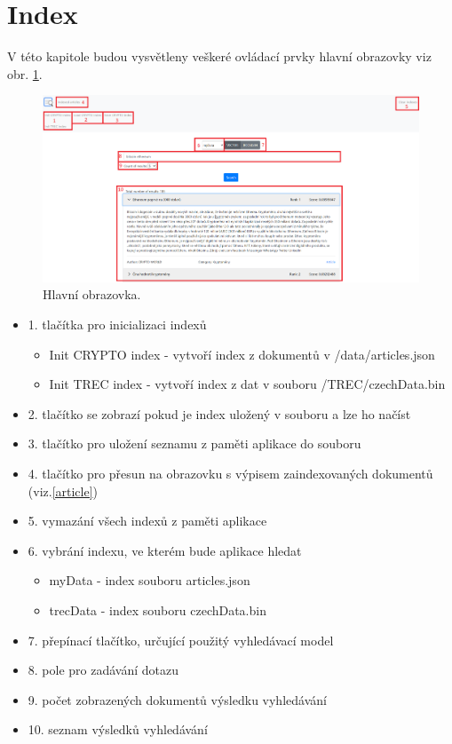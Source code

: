 \documentclass[
12pt,
a4paper,
pdftex,
czech,
titlepage
]{report}
\begin{document}
\section{Index}
V této kapitole budou vysvětleny veškeré ovládací prvky hlavní obrazovky viz obr. \ref{search}.
\begin{figure}
    \centering
	\includegraphics[width=13.5cm]{img/IR_search.png}
	\caption{Hlavní obrazovka.}
	\label{search}
\end{figure}
\begin{itemize}
    \item 1. tlačítka pro inicializaci indexů
    \begin{itemize}
        \item Init CRYPTO index - vytvoří index z dokumentů v /data/articles.json
        \item Init TREC index - vytvoří index z dat v souboru /TREC/czechData.bin
    \end{itemize}
    \item 2. tlačítko se zobrazí pokud je index uložený v souboru a lze ho načíst
    \item 3. tlačítko pro uložení seznamu z paměti aplikace do souboru
    \item 4. tlačítko pro přesun na obrazovku s výpisem zaindexovaných dokumentů (viz.\ref{article})
    \item 5. vymazání všech indexů z paměti aplikace
    \item 6. vybrání indexu, ve kterém bude aplikace hledat
    \begin{itemize}
        \item myData - index souboru articles.json
        \item trecData - index souboru czechData.bin
    \end{itemize}
    \item 7. přepínací tlačítko, určující použitý vyhledávací model
    \item 8. pole pro zadávání dotazu
    \item 9. počet zobrazených dokumentů výsledku vyhledávání
    \item 10. seznam výsledků vyhledávání
\end{itemize}
\label{article}
\end{document}
